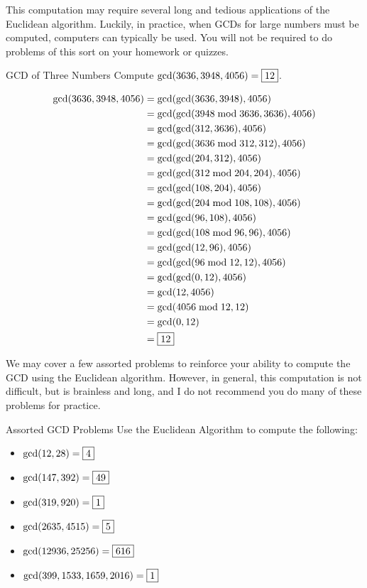 \documentclass[a4paper,10pt]{report}
\begin{document}
This computation may require several long and tedious applications of the
Euclidean algorithm. Luckily, in practice, when GCDs for large numbers must be
computed, computers can typically be used. You will not be required to do
problems of this sort on your homework or quizzes.

\begin{problem}{GCD of Three Numbers}
 Compute $\gcd(3636, 3948, 4056) = \Ans{12}$.

 \begin{solution}
  \begin{align*}
   \gcd(3636, 3948, 4056)
   &= \gcd(\gcd(3636, 3948), 4056) \\
   &= \gcd(\gcd(3948 \bmod 3636, 3636), 4056) \\
   &= \gcd(\gcd(312, 3636), 4056) \\
   &= \gcd(\gcd(3636 \bmod 312, 312), 4056) \\
   &= \gcd(\gcd(204, 312), 4056) \\
   &= \gcd(\gcd(312 \bmod 204, 204), 4056) \\
   &= \gcd(\gcd(108, 204), 4056) \\
   &= \gcd(\gcd(204 \bmod 108, 108), 4056) \\
   &= \gcd(\gcd(96, 108), 4056) \\
   &= \gcd(\gcd(108 \bmod 96, 96), 4056) \\
   &= \gcd(\gcd(12, 96), 4056) \\
   &= \gcd(\gcd(96 \bmod 12, 12), 4056) \\
   &= \gcd(\gcd(0, 12), 4056) \\
   &= \gcd(12, 4056) \\
   &= \gcd(4056 \bmod 12, 12) \\
   &= \gcd(0, 12) \\
   &= \Ans{12}
  \end{align*}
 \end{solution}
\end{problem}

We may cover a few assorted problems to reinforce your ability to compute the
GCD using the Euclidean algorithm. However, in general, this computation is not
difficult, but is brainless and long, and I do not recommend you do many of
these problems for practice.

\begin{problem}{Assorted GCD Problems}
 Use the Euclidean Algorithm to compute the following:

 \begin{itemize}
  \item $\gcd(12, 28) = \Ans{4}$
  \item $\gcd(147, 392) = \Ans{49}$
  \item $\gcd(319, 920) = \Ans{1}$
  \item $\gcd(2635, 4515) = \Ans{5}$
  \item $\gcd(12936, 25256) = \Ans{616}$
  \item $\gcd(399, 1533, 1659, 2016) = \Ans{1}$
 \end{itemize}
\end{problem}
\end{document}
